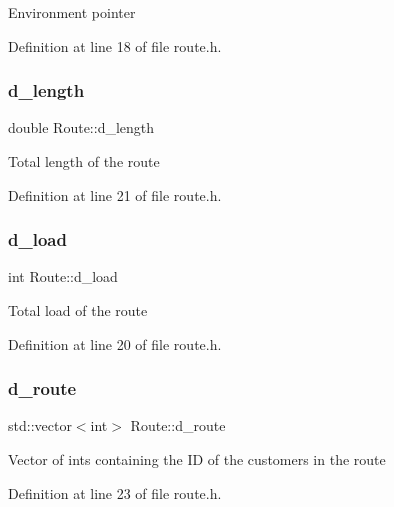 Environment pointer 

Definition at line 18 of file route.\+h.

\mbox{\label{class_route_a229ec36dcf99986891d1b306f82e457f}} 
\subsubsection{\texorpdfstring{d\+\_\+length}{d\_length}}
{\footnotesize\ttfamily double Route\+::d\+\_\+length\hspace{0.3cm}{\ttfamily [private]}}

Total length of the route 

Definition at line 21 of file route.\+h.

\mbox{\label{class_route_a718e90948453ba308e72da01c38023e6}} 
\subsubsection{\texorpdfstring{d\+\_\+load}{d\_load}}
{\footnotesize\ttfamily int Route\+::d\+\_\+load\hspace{0.3cm}{\ttfamily [private]}}

Total load of the route 

Definition at line 20 of file route.\+h.

\mbox{\label{class_route_ab18028e7736ff42aab699f254e7feda1}} 
\subsubsection{\texorpdfstring{d\+\_\+route}{d\_route}}
{\footnotesize\ttfamily std\+::vector$<$int$>$ Route\+::d\+\_\+route\hspace{0.3cm}{\ttfamily [private]}}

Vector of ints containing the ID of the customers in the route 

Definition at line 23 of file route.\+h.

\mbox{\label{class_route_a4c644f09b64e56e5d523e3177639b7fe}} 

